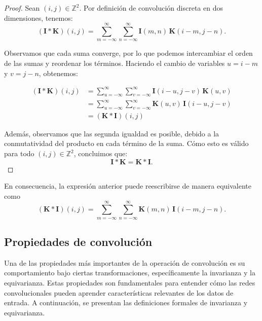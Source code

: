 \begin{proof}

    Sean $(i,j) \in \mathbb{Z}^2$. Por definición de convolución discreta en dos dimensiones, tenemos:
    \[
        (\mathbf{I} \ast \mathbf{K})(i,j) = \sum_{m=-\infty}^{\infty} \sum_{n=-\infty}^{\infty}
        \mathbf{I}(m,n)\, \mathbf{K}(i - m, j - n).
    \]

    Observamos que cada suma converge, por lo que podemos intercambiar el orden de las sumas y reordenar los términos. Haciendo el cambio de variables $u = i - m$ y $v = j - n$, obtenemos:

    \begin{align*}
        (\mathbf{I} \ast \mathbf{K})(i,j) & = \sum_{u=-\infty}^{\infty} \sum_{v=-\infty}^{\infty}
        \mathbf{I}(i - u, j - v)\, \mathbf{K}(u, v)                                               \\
                                          & = \sum_{u=-\infty}^{\infty} \sum_{v=-\infty}^{\infty}
        \mathbf{K}(u, v)\, \mathbf{I}(i - u, j - v)                                               \\
                                          & = (\mathbf{K} \ast \mathbf{I}) (i,j)
    \end{align*}

    Además, observamos que las segunda igualdad es posible, debido a  la conmutatividad del producto en cada término de la suma. Cómo esto es válido para todo $(i,j) \in \mathbb{Z}^2$, concluimos que:
    \[
        \mathbf{I} \ast \mathbf{K} = \mathbf{K} \ast \mathbf{I}.
    \]
\end{proof}

En consecuencia, la expresión anterior puede reescribirse de manera equivalente como
\[
    (\mathbf{K} \ast \mathbf{I})(i,j) =
    \sum_{m=-\infty}^{\infty} \sum_{n=-\infty}^{\infty}
    \mathbf{K}(m,n)\, \mathbf{I}(i - m, j - n).
\]

\subsection{Propiedades de convolución}
Una de las propiedades más importantes de la operación de convolución es su comportamiento bajo ciertas transformaciones, específicamente la invarianza y la equivarianza. Estas propiedades son fundamentales para entender cómo las redes convolucionales pueden aprender características relevantes de los datos de entrada.
A continuación, se presentan las definiciones formales de invarianza y equivarianza.

